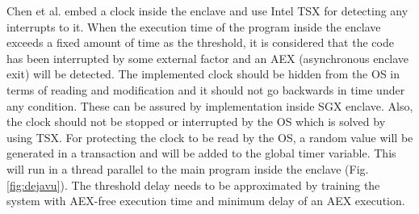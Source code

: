 Chen et al. \cite{dejavu} embed a clock inside the enclave and use Intel TSX for detecting any interrupts to it. When the execution time of the program inside the enclave exceeds a fixed amount of time as the threshold, it is considered that the code has been interrupted by some external factor and an AEX (asynchronous enclave exit) will be detected. The implemented clock should be hidden from the OS in terms of reading and modification and it should not go backwards in time under any condition. These can be assured by implementation inside SGX enclave. Also, the clock should not be stopped or interrupted by the OS which is solved by using TSX. For protecting the clock to be read by the OS, a random value will be generated in a transaction and will be added to the global timer variable. This will run in a thread parallel to the main program inside the enclave (Fig. \ref{fig:dejavu}). The threshold delay needs to be approximated by training the system with AEX-free execution time and minimum delay of an AEX execution.

